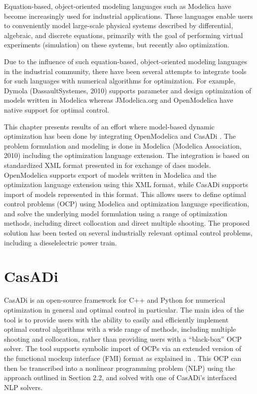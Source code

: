 Equation-based, object-oriented modeling languages such as Modelica  have become increasingly used for
industrial applications. These languages enable users to conveniently model large-scale physical systems described by 
differential, algebraic, and discrete equations, primarily with the goal of performing virtual experiments (simulation) 
on these systems, but recently also optimization.

Due to the influence of such equation-based, object-oriented modeling languages in the industrial community, there have
been several attempts to integrate tools for such languages with numerical algorithms for optimization. For example,
Dymola (DassaultSystemes, 2010) supports parameter and design optimization of models written in Modelica whereas
JModelica.org \cite{akesson} and OpenModelica \cite{bernhard} have native support for optimal
control.

This chapter presents results of an effort where model-based dynamic optimization has been done by integrating
OpenModelica and CasADi \cite{casadi}. The problem formulation and modeling is done in Modelica 
(Modelica Association, 2010) including the optimization \cite{optimica} language extension. The integration is based
on standardized XML format presented in \cite{xml} for exchange of \acrshort{daes}  models. 
OpenModelica supports export of models written in Modelica and the optimization language extension using this XML 
format, while CasADi supports import of models represented in this format. This allows users to define optimal control problems (OCP) using
Modelica and optimization language specification, and solve the underlying model formulation using a
range of optimization methods, including direct collocation and direct multiple shooting. The proposed
solution has been tested on several industrially relevant optimal control problems, including a dieselelectric
power train.

\section{CasADi}
\label{sec:optcasadi}

CasADi \cite{casadi} is an open-source framework for C++ and Python for numerical optimization in general and optimal control in particular. The main idea of the tool is to provide users with the ability to easily and efficiently implement optimal control algorithms with a wide range of methods, including multiple shooting and collocation, rather than providing users with a “black-box” OCP solver.
The tool supports symbolic import of OCPs via an extended version of the functional mockup interface (FMI) format as explained in \cite{optandersson}. This OCP can then be transcribed into a nonlinear programming problem (NLP) using the approach outlined in Section 2.2, and solved with one of CasADi’s interfaced NLP solvers.

